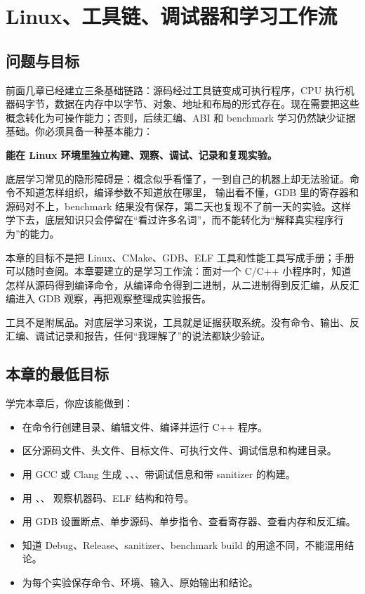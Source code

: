\chapter{Linux、工具链、调试器和学习工作流}

\section{问题与目标}

前面几章已经建立三条基础链路：源码经过工具链变成可执行程序，CPU 执行机器码字节，数据在内存中以字节、对象、地址和布局的形式存在。现在需要把这些概念转化为可操作能力；否则，后续汇编、ABI 和 benchmark 学习仍然缺少证据基础。你必须具备一种基本能力：

\begin{center}
\textbf{能在 Linux 环境里独立构建、观察、调试、记录和复现实验。}
\end{center}

底层学习常见的隐形障碍是：概念似乎看懂了，一到自己的机器上却无法验证。命令不知道怎样组织，编译参数不知道放在哪里， 输出看不懂，GDB 里的寄存器和源码对不上，benchmark 结果没有保存，第二天也复现不了前一天的实验。这样学下去，底层知识只会停留在“看过许多名词”，而不能转化为“解释真实程序行为”的能力。

本章的目标不是把 Linux、CMake、GDB、ELF 工具和性能工具写成手册；手册可以随时查阅。本章要建立的是学习工作流：面对一个 C/C++ 小程序时，知道怎样从源码得到编译命令，从编译命令得到二进制，从二进制得到反汇编，从反汇编进入 GDB 观察，再把观察整理成实验报告。

\begin{keyidea}
工具不是附属品。对底层学习来说，工具就是证据获取系统。没有命令、输出、反汇编、调试记录和报告，任何“我理解了”的说法都缺少验证。
\end{keyidea}

\section{本章的最低目标}

学完本章后，你应该能做到：

\begin{itemize}
  \item 在命令行创建目录、编辑文件、编译并运行 C++ 程序。
  \item 区分源码文件、头文件、目标文件、可执行文件、调试信息和构建目录。
  \item 用 GCC 或 Clang 生成 、、、带调试信息和带 sanitizer 的构建。
  \item 用 、、 观察机器码、ELF 结构和符号。
  \item 用 GDB 设置断点、单步源码、单步指令、查看寄存器、查看内存和反汇编。
  \item 知道 Debug、Release、sanitizer、benchmark build 的用途不同，不能混用结论。
  \item 为每个实验保存命令、环境、输入、原始输出和结论。
\end{itemize}

